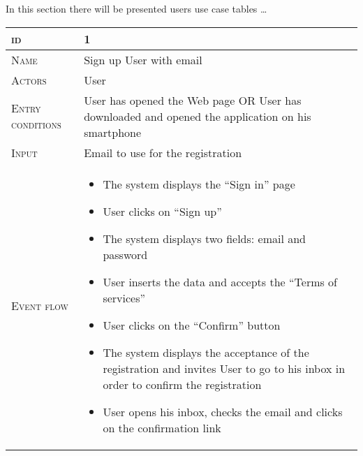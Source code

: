  In this section there will be presented users use case tables \ldots
\begin{table}[H]
    \centering
    \begin{tabular}[c]{|l|p{}|}
        \hline %
    	\textsc{id}                 &   1\\
    	\hline %
    	\textsc{Name}               &   Sign up User with email\\
    	\hline %
    	\textsc{Actors}             &   User\\
    	\hline %
    	\textsc{Entry conditions}   &   User has opened the Web page OR User has downloaded and opened the application on his smartphone\\
    	\hline %
    	\textsc{Input}   &   Email to use for the registration\\
    	\hline %
    	\textsc{Event flow}         &   %
            	                        \begin{itemize}
                                    	    \item The system displays the “Sign in” page
                                            \item User clicks on “Sign up”
                                            \item The system displays two fields: email and password
                                            \item User inserts the data and accepts the “Terms of services”
                                            \item User clicks on the “Confirm” button
                                            \item The system displays the acceptance of the registration and invites User to go to his inbox in order to confirm the registration
                                            \item User opens his inbox, checks the email and clicks on the confirmation link


\end{itemize}
\end{tabular}
\end{table}
